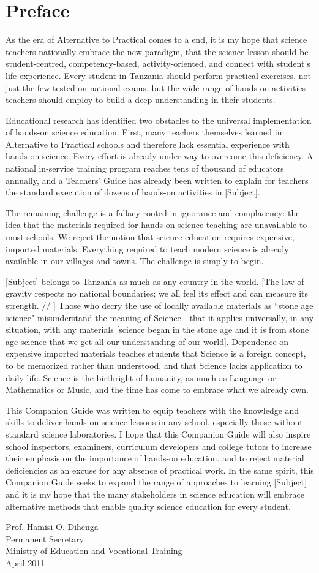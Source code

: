 \chapter*{Preface}

As the era of Alternative to Practical comes to a end, it is my hope 
that science teachers nationally embrace the new paradigm, that the science lesson should be student-centred, competency-based, activity-oriented, and connect with student's life experience. Every student in Tanzania should perform practical exercises, not just the few tested on national exams, but the wide range of hands-on activities teachers should employ to build a deep understanding in their students.

Educational research has identified two obstacles to the universal 
implementation of hands-on science education. First, many teachers themselves learned in Alternative to Practical schools and therefore lack essential experience with hands-on science. Every effort is already under way to overcome this deficiency. A national in-service training program reaches tens of thousand of educators annually, and a Teachers' Guide has already been written to explain for teachers the standard execution of dozens of hands-on activities in [Subject].

The remaining challenge is a fallacy rooted in ignorance and complacency: the idea that the materials required for hands-on science teaching are unavailable to most schools. We reject the notion that science education requires expensive, imported materials. Everything required to teach modern science is already available in our villages and towns. The challenge is simply to begin.

[Subject] belongs to Tanzania as much as any country in the world. [The 
law of gravity respects no national boundaries; we all feel its effect 
and can measure its strength. // ] Those who decry the use of locally 
available materials as ``stone age science" misunderstand the meaning 
of Science - that it applies universally, in any situation, with any materials [science began in the stone age and it is from stone age science that we get all our understanding of our world]. Dependence on expensive imported materials teaches students that Science is a foreign concept, to be memorized rather than understood, and that Science lacks application to daily life. Science is the birthright of humanity, as much as Language or Mathematics or Music, and the time has come to embrace what we already own.

This Companion Guide was written to equip teachers with the knowledge and skills to deliver hands-on science lessons in any school, especially those without standard science laboratories. I hope that this Companion Guide will also inspire school inspectors, examiners, curriculum developers and college tutors to increase their emphasis on the importance of hands-on education, and to reject material deficiencies as an excuse for any absence of practical work. In the same spirit, this Companion Guide seeks to expand the range of approaches to learning [Subject] and it is my hope that the many stakeholders in science education will embrace alternative methods that enable quality science education for every student.

Prof. Hamisi O. Dihenga\\
Permanent Secretary\\
Ministry of Education and Vocational Training\\
April 2011

